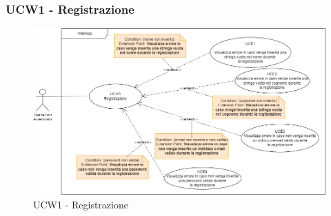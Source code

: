 \subsubsection{UCW1 - Registrazione}
\begin{figure}[!h]
\centering
\includegraphics[scale=0.5]{UC_images/UCW1.png}
\caption{UCW1 - Registrazione}
\end{figure}
